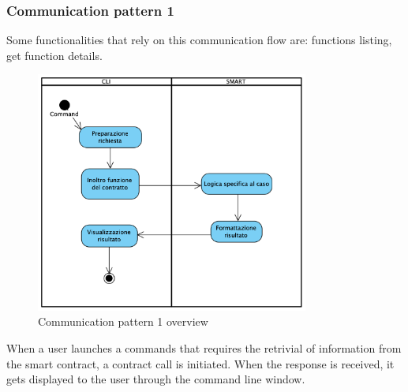 \subsubsection{Communication pattern 1}
Some functionalities that rely on this communication flow are: functions listing, get function details.
\begin{figure}[h]
	\centering
	\includegraphics[width=0.8\textwidth]{res/img/pattern1.png}
	\caption{Communication pattern 1 overview}
\end{figure}
\noindent When a user launches a commands that requires the retrivial of information from the smart contract, a contract call is initiated. When the response is received, it gets displayed to the user through the command line window.\newline 
\newpage
